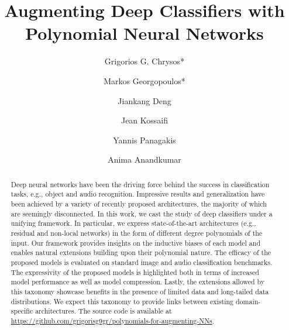 \documentclass[runningheads]{llncs}
\begin{document}
\pagestyle{headings}
\mainmatter
\def\ECCVSubNumber{8086}  

\title{Augmenting Deep Classifiers with Polynomial Neural Networks} 



\begin{comment}
\titlerunning{Augmenting Deep Classifiers with Polynomial Neural Networks} 
\authorrunning{Anonymous ECCV submission} 
\author{Anonymous ECCV submission}
\institute{Paper ID \ECCVSubNumber}
\end{comment}

\author{Grigorios G. Chrysos* \and
Markos Georgopoulos* 
\and 
Jiankang Deng 
\and
Jean Kossaifi 
\and
Yannis Panagakis 
\and
Anima Anandkumar 
}

\maketitle

\begin{abstract}
Deep neural networks have been the driving force behind the success in classification tasks, e.g., object and audio recognition.
Impressive results and generalization have been achieved by a variety of recently proposed architectures, the majority of which are seemingly disconnected.
In this work, we cast the study of deep classifiers under a unifying framework. In particular, we express state-of-the-art architectures (e.g., residual and non-local networks) in the form of different degree polynomials of the input. Our framework provides insights on the inductive biases of each model and enables natural extensions building upon their polynomial nature. The efficacy of the proposed models is evaluated on standard image and audio classification benchmarks. The expressivity of the proposed models is highlighted both in terms of increased model performance as well as model compression. Lastly, the extensions allowed by this taxonomy showcase benefits in the presence of limited data and long-tailed data distributions. We expect this taxonomy to provide links between existing domain-specific architectures. The source code is available at \url{https://github.com/grigorisg9gr/polynomials-for-augmenting-NNs}.
\end{abstract}
\end{document}
